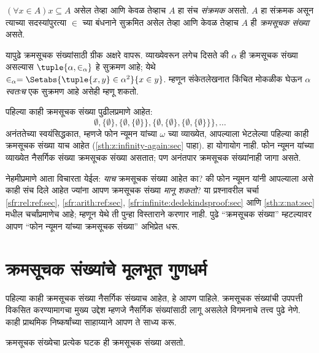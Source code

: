\begin{defn}
$(\forall x \in A)x \subseteq A$ असेल तेव्हा आणि केवळ तेव्हाच $A$ हा संच \emph{संक्रमक} असतो. $A$ हा संक्रमक असून त्याच्या सदस्यांपुरत्या $\in$ च्या बंधनाने सुक्रमित असेल तेव्हा आणि केवळ तेव्हाच $A$ ही \emph{क्रमसूचक संख्या} असते.
\end{defn}
\noindent
यापुढे क्रमसूचक संख्यांसाठी ग्रीक अक्षरे वापरू. व्याख्येवरून लगेच दिसते की $\alpha$ ही क्रमसूचक संख्या असल्यास $\tuple{\alpha, \in_\alpha}$ हे सुक्रमण आहे; येथे $\in_\alpha =
\Setabs{\tuple{x, y} \in \alpha^2}{x \in y}$. म्हणून संकेतलेखनात किंचित मोकळीक घेऊन $\alpha$ \emph{स्वतःच} एक सुक्रमण आहे असेही म्हणू शकतो.

पहिल्या काही क्रमसूचक संख्या पुढीलप्रमाणे आहेत:
\[
	\emptyset, \{\emptyset\},
	\{\emptyset, \{\emptyset\}\},
	\{\emptyset, \{\emptyset\}, \{\emptyset, \{\emptyset\}\}\}, \ldots
\]
अनंततेच्या स्वयंसिद्धकात, म्हणजे फोन न्यूमन यांच्या $\omega$ च्या व्याख्येत, आपल्याला भेटलेल्या पहिल्या काही क्रमसूचक संख्या याच आहेत (\ref{sth:z:infinity-again:sec} पाहा). हा योगायोग नाही. फोन न्यूमन यांच्या व्याख्येत नैसर्गिक संख्या क्रमसूचक संख्या असतात; पण अनंतपार क्रमसूचक संख्यांनाही जागा असते.

नेहमीप्रमाणे आता विचारता येईल: \emph{याच} क्रमसूचक संख्या आहेत का? की फोन न्यूमन यांनी आपल्याला असे काही संच दिले आहेत ज्यांना आपण क्रमसूचक संख्या \emph{मानू शकतो}? या प्रश्नावरील चर्चा \ref{sfr:rel:ref:sec}, \ref{sfr:arith:ref:sec}, \ref{sfr:infinite:dedekindsproof:sec} आणि \ref{sth:z:nat:sec} मधील चर्चांप्रमाणेच आहे; म्हणून येथे ती पुन्हा विस्ताराने करणार नाही. पुढे ``क्रमसूचक संख्या'' म्हटल्यावर आपण ``फोन न्यूमन यांच्या क्रमसूचक संख्या'' अभिप्रेत धरू.







\section{क्रमसूचक संख्यांचे मूलभूत गुणधर्म}\label{sth:ordinals:basic:sec}

पहिल्या काही क्रमसूचक संख्या नैसर्गिक संख्याच आहेत, हे आपण पाहिले. क्रमसूचक संख्यांची उपपत्ती विकसित करण्यामागचा मुख्य उद्देश म्हणजे नैसर्गिक संख्यांसाठी लागू असलेले विगमनाचे तत्त्व पुढे नेणे. काही प्राथमिक निष्कर्षांच्या साहाय्याने आपण ते साध्य करू.

\begin{lem}\label{sth:ordinals:basic:ordmemberord}
क्रमसूचक संख्येचा प्रत्येक घटक ही क्रमसूचक संख्या असतो.
\end{lem}

